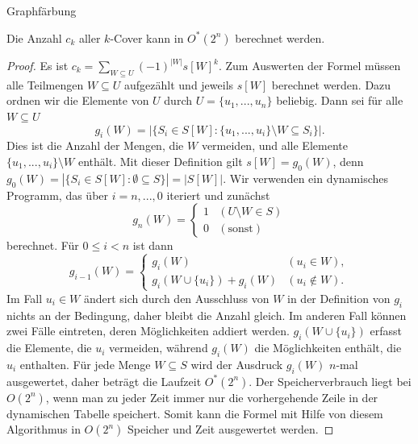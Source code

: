 \begin{section}{Graphfärbung}
  \begin{theorem}
    Die Anzahl \(c_k\) aller \(k\)-Cover kann in \(O^*(2^n)\) berechnet werden.
  \end{theorem}

  \begin{proof}
    Es ist \(c_k = \sum_{W \subseteq U} (-1)^{ |W| } s[W]^k\). Zum Auswerten der Formel müssen alle Teilmengen \(W \subseteq U\) aufgezählt und jeweils \(s[W]\) berechnet werden. Dazu ordnen wir die Elemente von \(U\) durch \(U = \{u_1,...,u_n\}\) beliebig. Dann sei für alle \(W \subseteq U\)
    \[ g_i(W) = | \{ S_i \in S[W] : \{ u_1, ..., u_i \} \setminus W \subseteq S_i \} |. \]
    Dies ist die Anzahl der Mengen, die \(W\) vermeiden, und alle Elemente \(\{ u_1, ..., u_i \} \setminus W\) enthält.
    Mit dieser Definition gilt \(s[W] = g_0(W)\), denn \(g_0(W) = | \{ S_i \in S[W] : \emptyset \subseteq S \} | = | S[W] |\). Wir verwenden ein dynamisches Programm, das über \(i = n, ..., 0\) iteriert und zunächst
    \[
       g_n(W) =
       \begin{cases}
          1 & (U \setminus W \in S) \\
          0 & (\text{sonst})
       \end{cases}
    \]
    berechnet. Für \(0 \leq i < n\) ist dann
    \[
      g_{i-1}(W) =
      \begin{cases}
         g_i(W) & (u_i \in W), \\
         g_i(W \cup \{ u_i \}) + g_i(W) & (u_i \notin W).
      \end{cases}
    \]
    Im Fall \(u_i \in W\) ändert sich durch den Ausschluss von \(W\) in der Definition von \(g_i\) nichts an der Bedingung, daher bleibt die Anzahl gleich. Im anderen Fall können zwei Fälle eintreten, deren Möglichkeiten addiert werden. \(g_i(W \cup \{ u_i \})\) erfasst die Elemente, die \(u_i\) vermeiden, während \(g_i(W)\) die Möglichkeiten enthält, die \(u_i\) enthalten. Für jede Menge \(W \subseteq S\) wird der Ausdruck \(g_i(W)\) \(n\)-mal ausgewertet, daher beträgt die Laufzeit \(O^*(2^n)\). Der Speicherverbrauch liegt bei \(O(2^n)\), wenn man zu jeder Zeit immer nur die vorhergehende Zeile in der dynamischen Tabelle speichert. Somit kann die Formel mit Hilfe von diesem Algorithmus in \(O(2^n)\) Speicher und Zeit ausgewertet werden.
  \end{proof}
\end{section}